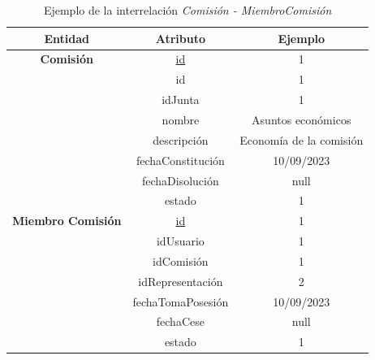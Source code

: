 \begin{itemize}
    \begin{table}[H]
    \centering
        \begin{tabular}{ | c | c | c |  }
             \hline
                 \textbf{Entidad} & \textbf{Atributo} & \textbf{Ejemplo}\\       
             \hline
                 \textbf{Comisión}  & \underline{id} & 1\\
                  & id & 1\\
                  & idJunta & 1\\
                  & nombre & Asuntos económicos\\
                  & descripción & Economía de la comisión\\
                  & fechaConstitución & 10/09/2023\\
                  & fechaDisolución & null\\
                  & estado & 1\\
              \hline
                 \textbf{Miembro Comisión}  & \underline{id} & 1\\
                  & idUsuario & 1\\
                  & idComisión & 1\\
                  & idRepresentación & 2\\
                  & fechaTomaPosesión & 10/09/2023\\
                  & fechaCese & null\\
                  & estado & 1\\
        \end{tabular}
        \caption{Ejemplo de la interrelación \textit{Comisión - MiembroComisión}}
        \label{table:I-Com-MiCom}
    \end{table}
\end{itemize}

